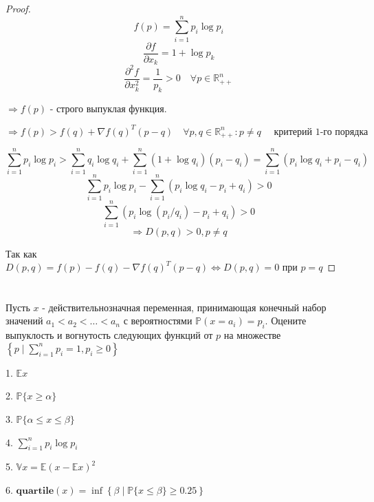 \documentclass[a4paper,12pt]{article}
\newcommand{\lt}{\left}
\newcommand{\rt}{\right}
\newcommand{\p}{\partial}
\newcommand{\fr}{\frac}
\newcommand{\dfr}{\dfrac}
\newcommand{\bb}{\mathbb}
\begin{document}
\begin{proof}

\begin{equation}\label{eq_plogp}
f(p) = \sum\limits_{i=1}^n p_i \log p_i
\end{equation}
$$\fr{\p f}{\p x_k} = 1 + \log p_k$$
$$\fr{\p^2 f}{\p x_k^2} = \dfr{1}{p_k} > 0 \quad \forall p \in \bb R^n_{++}$$

$\Rightarrow f(p)$ - строго выпуклая функция.

\begin{equation}\label{eq_pq}
\Rightarrow f(p) > f(q) + \nabla f(q)^T(p - q ) \quad \forall p,q \in \bb R^n_{++}: p \neq q \quad \text{ критерий 1-го порядка}
\end{equation}

$$\sum\limits_{i=1}^n p_i \log p_i > \sum\limits_{i=1}^n q_i \log q_i + \sum\limits_{i=1}^n (1 + \log q_i)(p_i - q_i) =  \sum\limits_{i=1}^n \lt(p_i\log q_i + p_i - q_i\rt)$$
$$\sum\limits_{i=1}^n p_i \log p_i - \sum\limits_{i=1}^n \lt(p_i\log q_i - p_i + q_i\rt) > 0$$
$$\sum\limits_{i=1}^n\lt( p_i \log (p_i/q_i) - p_i + q_i\rt) > 0$$
$$\Rightarrow D(p, q) > 0 , p\neq q$$

Так как $D(p, q) = f(p) - f(q) - \nabla f(q)^T(p - q) \Leftrightarrow D(p, q) = 0 \text{ при } p = q $  

	
	
\end{proof}

\section{}

Пусть $x$ - действительнозначная переменная, принимающая конечный набор значений $a_1 < a_2 < \ldots < a_n$ с вероятностями $\mathbb{P}(x = a_i) = p_i$. Оцените выпуклость и вогнутость следующих функций от $p$ на множестве $\left\{p \mid \sum\limits_{i=1}^n p_i = 1, p_i \ge 0 \right\}$  

1. $\mathbb{E}x$

2. $\mathbb{P}\{x \ge \alpha\}$

3. $\mathbb{P}\{\alpha \le x \le \beta\}$

4. $\sum\limits_{i=1}^n p_i \log p_i$

5. $\mathbb{V}x = \mathbb{E}(x - \mathbb{E}x)^2$

6. $\mathbf{quartile}(x) = {\operatorname{inf}}\left\{ \beta \mid \mathbb{P}\{x \le \beta\} \ge 0.25 \right\}$

\vspace{\baselineskip}
\end{document}
